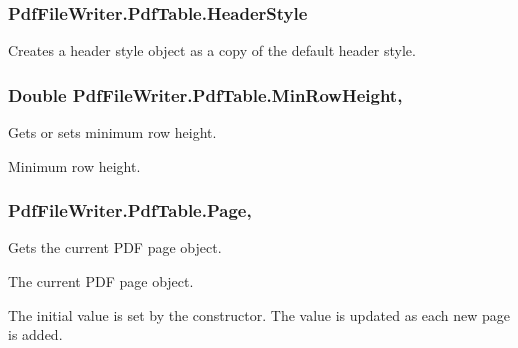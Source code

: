 \subsubsection[{\texorpdfstring{Header\+Style}{HeaderStyle}}]{ Pdf\+File\+Writer.\+Pdf\+Table.\+Header\+Style\hspace{0.3cm}{\ttfamily [get]}}\hypertarget{class_pdf_file_writer_1_1_pdf_table_ac44a069b8ba9105bd4a58d3993908644}{}\label{class_pdf_file_writer_1_1_pdf_table_ac44a069b8ba9105bd4a58d3993908644}


Creates a header style object as a copy of the default header style. 

\subsubsection[{\texorpdfstring{Min\+Row\+Height}{MinRowHeight}}]{\setlength{\rightskip}{0pt plus 5cm}Double Pdf\+File\+Writer.\+Pdf\+Table.\+Min\+Row\+Height\hspace{0.3cm}{\ttfamily [get]}, {\ttfamily [set]}}\hypertarget{class_pdf_file_writer_1_1_pdf_table_afa44012d7c5a2a5b721d5493c21c0de4}{}\label{class_pdf_file_writer_1_1_pdf_table_afa44012d7c5a2a5b721d5493c21c0de4}


Gets or sets minimum row height. 

Minimum row height.
\subsubsection[{\texorpdfstring{Page}{Page}}]{ Pdf\+File\+Writer.\+Pdf\+Table.\+Page\hspace{0.3cm}{\ttfamily [get]}, {\ttfamily [set]}}\hypertarget{class_pdf_file_writer_1_1_pdf_table_a430064f3636c28ed3cb46a3a4535b253}{}\label{class_pdf_file_writer_1_1_pdf_table_a430064f3636c28ed3cb46a3a4535b253}


Gets the current P\+DF page object. 

The current P\+DF page object.

The initial value is set by the constructor. The value is updated as each new page is added. 
